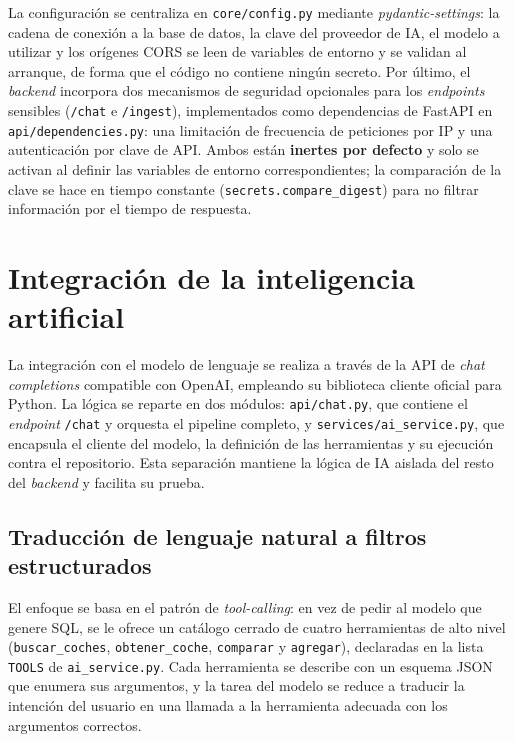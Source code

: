 La configuración se centraliza en \texttt{core/config.py} mediante
\emph{pydantic-settings}: la cadena de conexión a la base de datos, la clave del
proveedor de IA, el modelo a utilizar y los orígenes CORS se leen de variables de
entorno y se validan al arranque, de forma que el código no contiene ningún
secreto. Por último, el \emph{backend} incorpora dos mecanismos de seguridad
opcionales para los \emph{endpoints} sensibles (\texttt{/chat} e \texttt{/ingest}),
implementados como dependencias de FastAPI en \texttt{api/dependencies.py}: una
limitación de frecuencia de peticiones por IP y una autenticación por clave de
API. Ambos están \textbf{inertes por defecto} y solo se activan al definir las
variables de entorno correspondientes; la comparación de la clave se hace en
tiempo constante (\texttt{secrets.compare\_digest}) para no filtrar información
por el tiempo de respuesta.

\section{Integración de la inteligencia artificial}
\label{sec:impl-ia}

La integración con el modelo de lenguaje se realiza a través de la API de
\emph{chat completions} compatible con OpenAI, empleando su biblioteca cliente
oficial para Python. La lógica se reparte en dos módulos: \texttt{api/chat.py},
que contiene el \emph{endpoint} \texttt{/chat} y orquesta el pipeline completo, y
\texttt{services/ai\_service.py}, que encapsula el cliente del modelo, la
definición de las herramientas y su ejecución contra el repositorio. Esta
separación mantiene la lógica de IA aislada del resto del \emph{backend} y
facilita su prueba.

\subsection{Traducción de lenguaje natural a filtros estructurados}
\label{sec:impl-ia-tools}

El enfoque se basa en el patrón de \emph{tool-calling}: en vez de pedir al modelo
que genere SQL, se le ofrece un catálogo cerrado de cuatro herramientas de alto
nivel (\texttt{buscar\_coches}, \texttt{obtener\_coche}, \texttt{comparar} y
\texttt{agregar}), declaradas en la lista \texttt{TOOLS} de
\texttt{ai\_service.py}. Cada herramienta se describe con un esquema JSON que
enumera sus argumentos, y la tarea del modelo se reduce a traducir la intención
del usuario en una llamada a la herramienta adecuada con los argumentos correctos.

